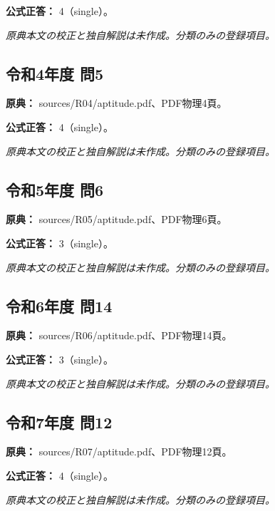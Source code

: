 \textbf{公式正答：} 4（single）。

\par\textit{原典本文の校正と独自解説は未作成。分類のみの登録項目。}

\subsection{令和4年度 問5}
\label{q:r04-reg-apt-05}

\noindent\textbf{原典：} sources/R04/aptitude.pdf、PDF物理4頁。

\textbf{公式正答：} 4（single）。

\par\textit{原典本文の校正と独自解説は未作成。分類のみの登録項目。}

\subsection{令和5年度 問6}
\label{q:r05-reg-apt-06}

\noindent\textbf{原典：} sources/R05/aptitude.pdf、PDF物理6頁。

\textbf{公式正答：} 3（single）。

\par\textit{原典本文の校正と独自解説は未作成。分類のみの登録項目。}

\subsection{令和6年度 問14}
\label{q:r06-reg-apt-14}

\noindent\textbf{原典：} sources/R06/aptitude.pdf、PDF物理14頁。

\textbf{公式正答：} 3（single）。

\par\textit{原典本文の校正と独自解説は未作成。分類のみの登録項目。}

\subsection{令和7年度 問12}
\label{q:r07-reg-apt-12}

\noindent\textbf{原典：} sources/R07/aptitude.pdf、PDF物理12頁。

\textbf{公式正答：} 4（single）。

\par\textit{原典本文の校正と独自解説は未作成。分類のみの登録項目。}
